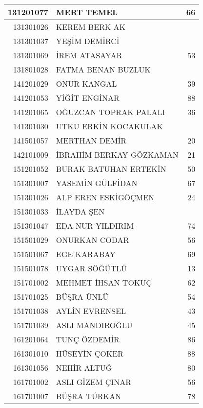\documentclass[12pt]{article}
\begin{document}
\begin{longtable}{||r||l||r||}
    \midrule
    131201077 & MERT TEMEL & 66 \\
    \midrule
    131301026 & KEREM BERK AK &  \\
    \midrule
    131301037 & YEŞİM DEMİRCİ &  \\
    \midrule
    131301069 & İREM ATASAYAR & 53 \\
    \midrule
    131801028 & FATMA BENAN BUZLUK &  \\
    \midrule
    141201029 & ONUR KANGAL & \cellcolor[rgb]{ 1,  1,  0} 39 \\
    \midrule
    141201053 & YİĞİT ENGİNAR & 88 \\
    \midrule
    141201065 & OĞUZCAN TOPRAK PALALI & 36 \\
    \midrule
    141301030 & UTKU ERKİN KOCAKULAK &  \\
    \midrule
    141501057 & MERTHAN DEMİR & 20 \\
    \midrule
    142101009 & İBRAHİM BERKAY GÖZKAMAN & 21 \\
    \midrule
    151201052 & BURAK BATUHAN ERTEKİN & 50 \\
    \midrule
    151301007 & YASEMİN GÜLFİDAN & 67 \\
    \midrule
    151301026 & ALP EREN ESKİGÖÇMEN & 24 \\
    \midrule
    151301033 & İLAYDA ŞEN &  \\
    \midrule
    151301047 & EDA NUR YILDIRIM & \cellcolor[rgb]{ 1,  1,  0} 74 \\
    \midrule
    151501029 & ONURKAN CODAR & 56 \\
    \midrule
    151501067 & EGE KARABAY & 69 \\
    \midrule
    151501078 & UYGAR SÖĞÜTLÜ & 13 \\
    \midrule
    151701002 & MEHMET İHSAN TOKUÇ & 62 \\
    \midrule
    151701025 & BÜŞRA ÜNLÜ & 54 \\
    \midrule
    151701038 & AYLİN EVRENSEL & 43 \\
    \midrule
    151701039 & ASLI MANDIROĞLU & \cellcolor[rgb]{ 1,  1,  0} 45 \\
    \midrule
    161201064 & TUNÇ ÖZDEMİR & 86 \\
    \midrule
    161301010 & HÜSEYİN ÇOKER & 88 \\
    \midrule
    161301056 & NEHİR ALTUĞ & 80 \\
    \midrule
    161701002 & ASLI GİZEM ÇINAR & 56 \\
    \midrule
    161701007 & BÜŞRA TÜRKAN & 78 \\

\end{longtable}
\end{document}
